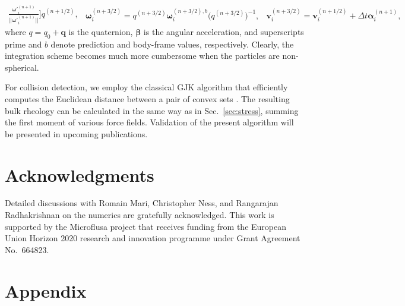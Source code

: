 \begin{subequations}
\begin{equation}
\begin{aligned}
        \frac{{\bm \omega '}_i^{(n+1)}}{||{\bm \omega '}_i^{(n+1)}||}  \bigg] q^{(n+1/2)},
    \end{aligned} \label{qua 4b}
  \end{equation}
  \begin{equation} 
    \begin{aligned}
      {\bm \omega}_i^{(n+3/2)} = q^{(n+3/2)} {\bm \omega}_i^{(n+3/2),b} \bigg( q^{(n+3/2)} \bigg)^{-1},
    \end{aligned} \label{qua 4c}
  \end{equation}
  \begin{equation} 
    \begin{aligned}
      {\bm v}_i^{(n+3/2)} = {\bm v}_i^{(n+1/2)}+ \Delta t {\bm \alpha}_i^{(n+1)},
    \end{aligned} \label{qua 4d}
  \end{equation}
\end{subequations}
where $q=q_0+{\bm q}$ is the quaternion, ${\bm \beta}$ is the angular acceleration, and superscripts prime and $b$ denote prediction and body-frame values, respectively. Clearly, the integration scheme becomes much more cumbersome when the particles are non-spherical.

For collision detection, we employ the classical GJK algorithm that efficiently computes the Euclidean distance between a pair of convex sets \citep{GJK1988}. The resulting bulk rheology can be calculated in the same way as in Sec.\ \ref{sec:stress}, \ie summing the first moment of various force fields. Validation of the present algorithm will be presented in upcoming publications.


\section*{Acknowledgments}

Detailed discussions with Romain Mari, Christopher Ness, and Rangarajan Radhakrishnan on the numerics are gratefully acknowledged. This work is supported by the Microflusa project that receives funding from the European Union Horizon 2020 research and innovation programme under Grant Agreement No.\ 664823.



\section*{Appendix}

\renewcommand\thesubsection{\Alph{subsection}}  %
\renewcommand{\theequation}{\thesubsection.\arabic{equation}} %

